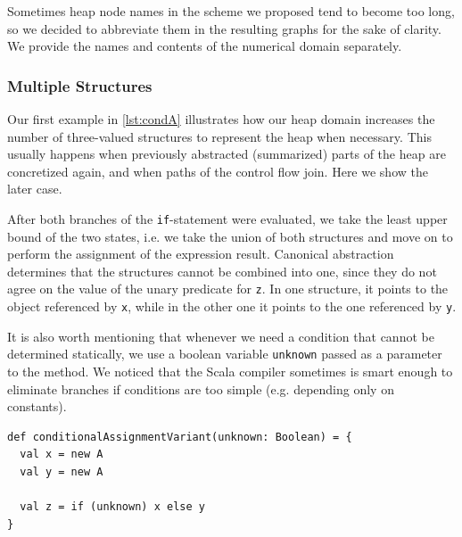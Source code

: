 \documentclass[11pt,a4paper,english]{article}
\begin{document}
Sometimes heap node names in the scheme we proposed tend to become too long,
so we decided to abbreviate them in the resulting graphs for the sake of
clarity. We provide the names and contents of the numerical domain separately.

\subsubsection{Multiple Structures}
Our first example in \autoref{lst:condA} illustrates how our
heap domain increases the number of three-valued structures to
represent the heap when necessary. This usually happens when previously
abstracted (summarized) parts of the heap are concretized again, and when paths
of the control flow join. Here we show the later case.   

After both branches of the \texttt{if}-statement were evaluated, we take the
least upper bound of the two states, i.e. we take the union of both structures
and move on to perform the assignment of the expression result. Canonical
abstraction determines that the structures cannot be combined into one,
since they do not agree on the value of the unary predicate for \texttt{z}. In one
structure, it points to the object referenced by \texttt{x}, while in the other
one it points to the one referenced by \texttt{y}.

It is also worth mentioning that whenever we need a condition that
cannot be determined statically, we use a boolean variable \texttt{unknown}
passed as a parameter to the method. We noticed that the Scala compiler
sometimes is smart enough to eliminate branches if conditions are too simple
(e.g. depending only on constants).

\begin{lstlisting}[float,caption={\texttt{if}-branches and heap
  structures},label={lst:condA}]
def conditionalAssignmentVariant(unknown: Boolean) = {
  val x = new A
  val y = new A
  	
  val z = if (unknown) x else y
}
\end{lstlisting}
\end{document}
